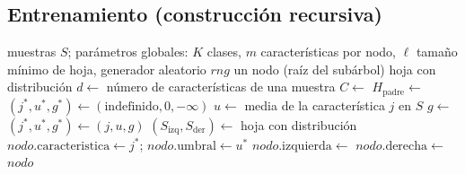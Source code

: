 \documentclass[11pt,a4paper]{article}
\begin{document}
\subsection{Entrenamiento (construcción recursiva)}

\begin{algorithm}[h]
\caption{Construcción de un árbol de decisión}
\begin{algorithmic}[1]
  \Require muestras $S$; parámetros globales: $K$ clases, $m$ características por nodo,
           $\ell$ tamaño mínimo de hoja, generador aleatorio $\mathit{rng}$
  \Ensure un nodo (raíz del subárbol)
     \State \Return hoja con distribución 
  \EndIf
  \State $d \gets$ número de características de una muestra
  \State $C \gets$ 
  \State $H_{\text{padre}} \gets$ 
  \State $(j^\ast, u^\ast, g^\ast) \gets (\text{indefinido}, 0, -\infty)$
     \State $u \gets$ media de la característica $j$ en $S$
     \State $g \gets$ 
        \State $(j^\ast, u^\ast, g^\ast) \gets (j, u, g)$
     \EndIf
  \EndFor
  \State $(S_{\text{izq}}, S_{\text{der}}) \gets$ 
     \State \Return hoja con distribución 
  \EndIf
  \State $\mathit{nodo}.\text{caracteristica} \gets j^\ast$;\quad
         $\mathit{nodo}.\text{umbral} \gets u^\ast$
  \State $\mathit{nodo}.\text{izquierda} \gets$ 
  \State $\mathit{nodo}.\text{derecha} \gets$ 
  \State \Return $\mathit{nodo}$
\EndFunction
\end{algorithmic}
\end{algorithm}
\end{document}

